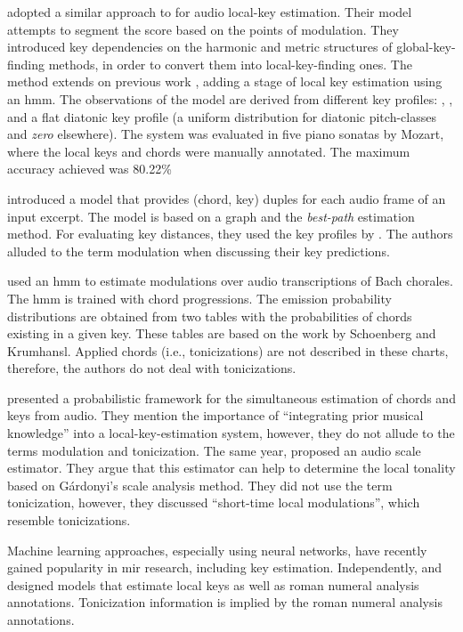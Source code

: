 \textcite{papadopoulos2009local} adopted a similar approach
to \textcite{izmirli2007localized} for audio local-key
estimation. Their model attempts to segment the score based
on the points of modulation. They introduced key
dependencies on the harmonic and metric structures of
global-key-finding methods, in order to convert them into
local-key-finding ones. The method extends on previous work
\parencite{papadopoulos2008simultaneous}, adding a stage of
local key estimation using an \gls{hmm}. The observations of
the model are derived from different key profiles:
\textcite{krumhansl1982tracing},
\textcite{temperley1999whats}, and a flat diatonic key
profile (a uniform distribution for diatonic pitch-classes
and \emph{zero} elsewhere). The system was evaluated in five
piano sonatas by Mozart, where the local keys and chords
were manually annotated. The maximum accuracy achieved was
80.22\%


\textcite{rocher2010concurrent} introduced a model that
provides (chord, key) duples for each audio frame of an
input excerpt. The model is based on a graph and the
\emph{best-path} estimation method. For evaluating key
distances, they used the key profiles by
\textcite{temperley1999whats}. The authors alluded to the
term modulation when discussing their key predictions.

\textcite{mearns2011automatically} used an \gls{hmm} to
estimate modulations over audio transcriptions of Bach
chorales. The \gls{hmm} is trained with chord progressions.
The emission probability distributions are obtained from two
tables with the probabilities of chords existing in a given
key. These tables are based on the work by Schoenberg and
Krumhansl. Applied chords (i.e., tonicizations) are not
described in these charts, therefore, the authors do not
deal with tonicizations.

\textcite{pauwels2014combining} presented a probabilistic
framework for the simultaneous estimation of chords and keys
from audio. They mention the importance of ``integrating
prior musical knowledge'' into a local-key-estimation
system, however, they do not allude to the terms modulation
and tonicization. The same year,
\textcite{weis2014chromabased} proposed an audio scale
estimator. They argue that this estimator can help to
determine the local tonality based on G\'{a}rdonyi's scale
analysis method. They did not use the term tonicization,
however, they discussed ``short-time local modulations'',
which resemble tonicizations.

Machine learning approaches, especially using neural
networks, have recently gained popularity in \gls{mir}
research, including key estimation. Independently,
\textcite{chen2018functional, chen2019harmony} and
\textcite{micchi2020not} designed models that estimate local
keys as well as roman numeral analysis annotations.
Tonicization information is implied by the roman numeral
analysis annotations.

